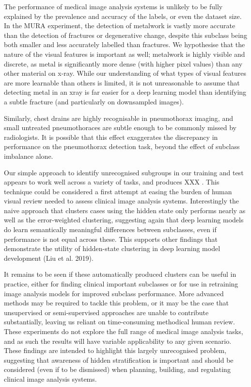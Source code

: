 \documentclass{article}
\begin{document}
The performance of medical image analysis systems is unlikely to be fully explained by the prevalence and accuracy of the labels, or even the dataset size. 
In the MURA experiment, the detection of metalwork is vastly more accurate than the detection of fractures or degenerative change, despite this subclass being both smaller and less accurately labelled than fractures. 
We hypothesise that the nature of the visual features is important as well; metalwork is highly visible and discrete, as metal is significantly more dense (with higher pixel values) than any other material on x-ray. 
While our understanding of what types of visual features are more learnable than others is limited, it is not unreasonable to assume that detecting metal in an xray is far easier for a deep learning model than identifying a subtle fracture (and particularly on downsampled images).

Similarly, chest drains are highly recognisable in pneumothorax imaging, and small untreated pneumothoraces are subtle enough to be commonly missed by radiologists. 
It is possible that this effect exaggerates the discrepancy in performance on the pneumothorax detection task, beyond the effect of subclass imbalance alone.

Our simple approach to identify unrecognised subgroups in our training and test appears to work well across a variety of tasks, and produces XXX . 
This technique could be considered a first attempt at easing the burden of human visual review needed to assess clinical image analysis systems. 
Interestingly the naive approach that clusters cases using the hidden state only performs nearly as well as the error-weighted clustering, suggesting again that deep learning models do learn semantically meaningful differences between subclasses, even if performance is not equal across these. 
This supports other findings that demonstrate the utility of hidden-state clustering in deep learning model development (Liu et al. 2019).

It remains to be seen if these automatically produced clusters can be useful in practice, either for finding clinical important subclasses or for use in retraining image analysis models for improved subclass performance. 
More advanced methods may be required to tackle this problem, or it may be the case that unsupervised or semi-supervised approaches are unable to contribute substantially, leaving us reliant on time-consuming methodical human review.
These experiments do not explore the full range of medical image analysis tasks, and as such the results will have variable applicability to any given scenario.
 These findings are intended to highlight this largely unrecognised problem, suggesting that awareness of hidden stratification is important and should be considered (even if to be dismissed) when planning, building, and regulating clinical image analysis systems.
 
\end{document}
